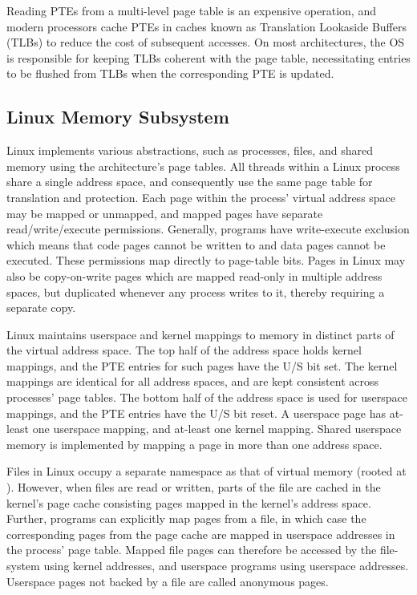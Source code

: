 \documentclass[letterpaper,twocolumn,10pt, anonymous]{article}
\begin{document}
Reading PTEs from a multi-level page table is an expensive operation, and 
modern processors cache PTEs in caches known as Translation Lookaside 
Buffers (TLBs) to reduce the cost of subsequent accesses. 
On most architectures, the OS is responsible for keeping TLBs coherent with 
the page table, necessitating entries to be flushed from TLBs when the 
corresponding PTE is updated.


\subsection{Linux Memory Subsystem}

Linux implements various abstractions, such as processes, files, and shared
memory using the architecture's page tables.
All threads within a Linux process share a single address space, and 
consequently use the same page table for translation and protection.
Each page within the process' virtual address space may be mapped or 
unmapped, and mapped pages have separate read/write/execute permissions.
Generally, programs have write-execute exclusion which means that 
code pages cannot be written to and data pages cannot be executed.
These permissions map directly to page-table bits.
Pages in Linux may also be copy-on-write pages which are mapped read-only
in multiple address spaces, but duplicated whenever any process writes
to it, thereby requiring a separate copy.

Linux maintains userspace and kernel mappings to memory in distinct 
parts of the virtual address space. 
The top half of the address space holds kernel mappings, and the 
PTE entries for such pages have the U/S bit set. 
The kernel mappings are identical for all address spaces, and are 
kept consistent across processes' page tables.
The bottom half of the address space is used for userspace mappings, 
and the PTE entries have the U/S bit reset.
A userspace page has at-least one userspace mapping, and at-least one
kernel mapping.
Shared userspace memory is implemented by mapping a page in more than 
one address space.

Files in Linux occupy a separate namespace as that of virtual memory
(rooted at \Code{/}).
However, when files are read or written, parts of the file are cached
in the kernel's page cache consisting pages mapped in the kernel's 
address space.
Further, programs can explicitly map pages from a file, in which case 
the corresponding pages from the page cache are mapped in userspace 
addresses in the process' page table.
Mapped file pages can therefore be accessed by the file-system using 
kernel addresses, and userspace programs using userspace addresses.
Userspace pages not backed by a file are called anonymous pages.
\end{document}
